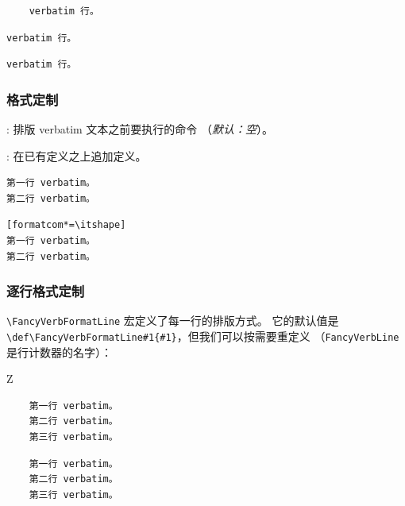 \documentclass[twoside]{article}
\newcommand\cs[1]{\texttt{\textbackslash#1}}
\providecommand\optname[1]{\textsf{#1}}
\newenvironment{optlist}{\begin{description}%
  \renewcommand\makelabel[1]{%
    \descriptionlabel{\mdseries\optname{##1}}}%
  \itemsep0.25\itemsep}%
 {\end{description}}
\begin{document}
\begin{SideBySideExample}
  \begin{Verbatim}
    verbatim 行。
  \end{Verbatim}

  \begin{Verbatim}[gobble=2]
    verbatim 行。
  \end{Verbatim}

  \begin{Verbatim}[gobble=8]
    verbatim 行。
  \end{Verbatim}
\end{SideBySideExample}

\subsubsection{格式定制}

\begin{optlist}
  \item[formatcom (command)]: 排版 verbatim 文本之前要执行的命令
  （\emph{默认：空}）。
  \item[formatcom* (command)]: 在已有定义之上追加定义。
\end{optlist}

\begin{SideBySideExample}
\begin{Verbatim}[formatcom=\color{red}]
第一行 verbatim。
第二行 verbatim。
\end{Verbatim}
\end{SideBySideExample}

\begin{SideBySideExample}
\begin{Verbatim}[formatcom*=\itshape]
第一行 verbatim。
第二行 verbatim。
\end{Verbatim}
\end{SideBySideExample}

\subsubsection{逐行格式定制}

  \cs{FancyVerbFormatLine} 宏定义了每一行的排版方式。
它的默认值是 \verb+\def\FancyVerbFormatLine#1{#1}+，但我们可以按需要重定义
（\texttt{FancyVerbLine} 是行计数器的名字）：

{
\begin{SideBySideExample}
  Z
  \renewcommand{\FancyVerbFormatLine}[1]{%
    \makebox[0cm][l]{$\Rightarrow$}#1}
  \begin{Verbatim}
    第一行 verbatim。
    第二行 verbatim。
    第三行 verbatim。
  \end{Verbatim}
\end{SideBySideExample}

\begin{SideBySideExample}
  \renewcommand{\FancyVerbFormatLine}[1]{%
    \ifodd\value{FancyVerbLine}%
      \MakeUppercase{#1}\else#1\fi}
  \begin{Verbatim}
    第一行 verbatim。
    第二行 verbatim。
    第三行 verbatim。
  \end{Verbatim}
\end{SideBySideExample}
}
\end{document}
